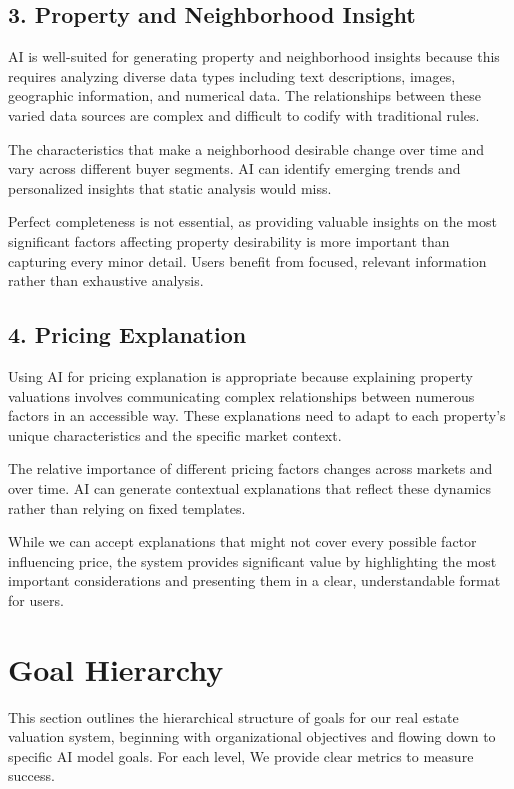 \subsection*{3. Property and Neighborhood Insight}
AI is well-suited for generating property and neighborhood insights because this requires analyzing diverse data types including text descriptions, images, geographic information, and numerical data. The relationships between these varied data sources are complex and difficult to codify with traditional rules.

The characteristics that make a neighborhood desirable change over time and vary across different buyer segments. AI can identify emerging trends and personalized insights that static analysis would miss.

Perfect completeness is not essential, as providing valuable insights on the most significant factors affecting property desirability is more important than capturing every minor detail. Users benefit from focused, relevant information rather than exhaustive analysis.

\subsection*{4. Pricing Explanation}
Using AI for pricing explanation is appropriate because explaining property valuations involves communicating complex relationships between numerous factors in an accessible way. These explanations need to adapt to each property's unique characteristics and the specific market context.

The relative importance of different pricing factors changes across markets and over time. AI can generate contextual explanations that reflect these dynamics rather than relying on fixed templates.

While we can accept explanations that might not cover every possible factor influencing price, the system provides significant value by highlighting the most important considerations and presenting them in a clear, understandable format for users.

\newpage

\section{Goal Hierarchy}

This section outlines the hierarchical structure of goals for our real estate valuation system, beginning with organizational objectives and flowing down to specific AI model goals. For each level, We provide clear metrics to measure success.

